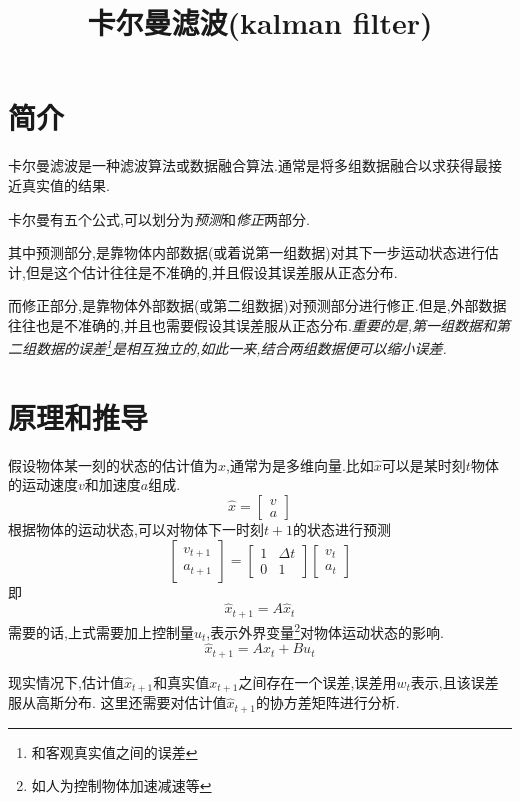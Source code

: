 \documentclass{ctexart}
\begin{document}
\title{卡尔曼滤波(kalman filter)}
\author{ }
\maketitle

\newpage
\section{简介}
卡尔曼滤波是一种滤波算法或数据融合算法.通常是将多组数据融合以求获得最接近真实值的结果.

卡尔曼有五个公式,可以划分为\emph{预测}和\emph{修正}两部分.

其中预测部分,是靠物体内部数据(或着说第一组数据)对其下一步运动状态进行估计,但是这个估计往往是不准确的,并且假设其误差服从正态分布.

而修正部分,是靠物体外部数据(或第二组数据)对预测部分进行修正.但是,外部数据往往也是不准确的,并且也需要假设其误差服从正态分布.\emph{重要的是,第一组数据和第二组数据的误差\footnote{和客观真实值之间的误差}是相互独立的,如此一来,结合两组数据便可以缩小误差.}

\section{原理和推导}
假设物体某一刻的状态的估计值为$\hat x$,通常为是多维向量.比如$\hat x$可以是某时刻$t$物体的运动速度$v$和加速度$a$组成.
$$\hat x=
 \left[
 \begin{array}{c}
   v \\
   a	
 \end{array}
 \right]
$$
根据物体的运动状态,可以对物体下一时刻$t+1$的状态进行预测
$$
 \left[\begin{array}{c}
   v_{t+1} \\
   a_{t+1}	
 \end{array}\right]
 =
 \left[\begin{matrix}
 	1 & \Delta t \\
 	0 & 1
 \end{matrix}\right]
 \left[\begin{array}{c}
   v_{t} \\
   a_{t}
 \end{array}\right]
$$即
$$\hat x_{t+1}=A\hat x_{t}$$
需要的话,上式需要加上控制量$u_t$,表示外界变量\footnote{如人为控制物体加速减速等}对物体运动状态的影响.
\begin{equation}
\hat x_{t+1}=A\hat x_{t}+Bu_{t}	
\end{equation}

现实情况下,估计值$\hat x_{t+1}$和真实值$x_{t+1}$之间存在一个误差,误差用$w_t$表示,且该误差服从高斯分布.
这里还需要对估计值$\hat x_{t+1}$的协方差矩阵进行分析.
\end{document}
